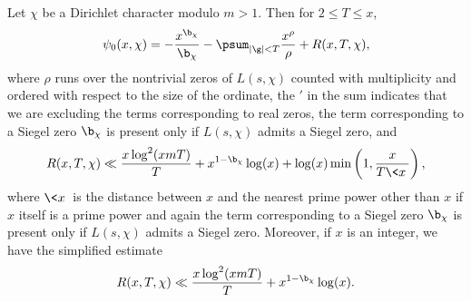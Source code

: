     \begin{corollary}\label{cor:explicit_formula_Dirichlet_corollary}
      Let $\chi$ be a Dirichlet character modulo $m > 1$. Then for $2 \le T \le x$,
      \[
        \psi_{0}(x,\chi) = -\frac{x^{\b_{\chi}}}{\b_{\chi}}-\psum_{|\g| < T}\frac{x^{\rho}}{\rho}+R(x,T,\chi),
      \]
      where $\rho$ runs over the nontrivial zeros of $L(s,\chi)$ counted with multiplicity and ordered with respect to the size of the ordinate, the $'$ in the sum indicates that we are excluding the terms corresponding to real zeros, the term corresponding to a Siegel zero $\b_{\chi}$ is present only if $L(s,\chi)$ admits a Siegel zero, and
      \[
        R(x,T,\chi) \ll \frac{x\log^{2}(xmT)}{T}+x^{1-\b_{\chi}}\log(x)+\log(x)\min\left(1,\frac{x}{T\<x\>}\right),
      \]
      where $\<x\>$ is the distance between $x$ and the nearest prime power other than $x$ if $x$ itself is a prime power and again the term corresponding to a Siegel zero $\b_{\chi}$ is present only if $L(s,\chi)$ admits a Siegel zero. Moreover, if $x$ is an integer, we have the simplified estimate
      \[
        R(x,T,\chi) \ll \frac{x\log^{2}(xmT)}{T}+x^{1-\b_{\chi}}\log(x).
      \]
    \end{corollary}
